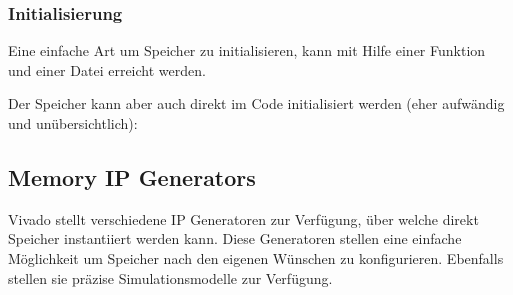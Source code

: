 \subsubsection{Initialisierung}
Eine einfache Art um Speicher zu initialisieren, kann mit Hilfe einer Funktion und einer Datei erreicht werden.


Der Speicher kann aber auch direkt im Code initialisiert werden (eher aufwändig und unübersichtlich):


\subsection{Memory IP Generators}
Vivado stellt verschiedene IP Generatoren zur Verfügung, über welche direkt Speicher instantiiert werden kann. Diese Generatoren stellen eine einfache Möglichkeit um Speicher nach den eigenen Wünschen zu konfigurieren. Ebenfalls stellen sie präzise Simulationsmodelle zur Verfügung.